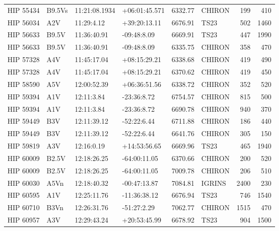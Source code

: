 \documentclass{emulateapj}
\begin{document}
\begin{longtable*}{|l|lllrlrr|}
   HIP 55434 &         B9.5Vs &  11:21:08.1934 &  +06:01:45.571 &  6332.77 &     CHIRON &      199 &     410 \\
   HIP 56034 &            A2V &     11:29:4.12 &   +39:20:13.11 &  6676.91 &       TS23 &      502 &    1460 \\
   HIP 56633 &          B9.5V &    11:36:40.91 &    -09:48:8.09 &  6669.91 &       TS23 &      447 &    1990 \\
   HIP 56633 &          B9.5V &    11:36:40.91 &    -09:48:8.09 &  6335.75 &     CHIRON &      358 &     470 \\
   HIP 57328 &            A4V &    11:45:17.04 &   +08:15:29.21 &  6338.68 &     CHIRON &      419 &     490 \\
   HIP 57328 &            A4V &    11:45:17.04 &   +08:15:29.21 &  6370.62 &     CHIRON &      419 &     450 \\
   HIP 58590 &            A5V &    12:00:52.39 &   +06:36:51.56 &  6338.72 &     CHIRON &      352 &     520 \\
   HIP 59394 &            A1V &     12:11:3.84 &    -23:36:8.72 &  6754.57 &     CHIRON &      815 &     500 \\
   HIP 59394 &            A1V &     12:11:3.84 &    -23:36:8.72 &  6690.78 &     CHIRON &      940 &     370 \\
   HIP 59449 &            B3V &    12:11:39.12 &    -52:22:6.44 &  6711.88 &     CHIRON &      186 &     440 \\
   HIP 59449 &            B3V &    12:11:39.12 &    -52:22:6.44 &  6641.76 &     CHIRON &      305 &     150 \\
   HIP 59819 &            A3V &     12:16:0.19 &   +14:53:56.65 &  6669.96 &       TS23 &      465 &    1940 \\
   HIP 60009 &          B2.5V &    12:18:26.25 &   -64:00:11.05 &  6370.66 &     CHIRON &      200 &     520 \\
   HIP 60009 &          B2.5V &    12:18:26.25 &   -64:00:11.05 &  7009.78 &     CHIRON &      206 &     510 \\
   HIP 60030 &           A5Vn &    12:18:40.32 &   -00:47:13.87 &  7084.81 &     IGRINS &     2400 &     230 \\
   HIP 60595 &            A1V &    12:25:11.76 &   -11:36:38.12 &  6676.94 &       TS23 &      746 &    1540 \\
   HIP 60710 &           B3Vn &    12:26:31.76 &    -51:27:2.29 &  7062.77 &     CHIRON &     1515 &     470 \\
   HIP 60957 &            A3V &    12:29:43.24 &   +20:53:45.99 &  6678.92 &       TS23 &      904 &    1500 \\

\end{longtable*}
\end{document}
